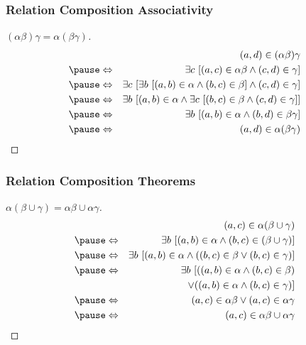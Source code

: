 \documentclass[dvipsnames]{beamer}
\begin{document}
\begin{frame}
  \frametitle{Relation Composition Associativity}

  \begin{proof}[$(\alpha \beta) \gamma = \alpha (\beta \gamma)$]
    \pause
    \begin{eqnarray*}
      &                 & (a,d) \in (\alpha \beta)\gamma\\\pause
      & \Leftrightarrow & \exists c~[(a,c) \in \alpha \beta
                              \wedge (c,d) \in \gamma]\\\pause
      & \Leftrightarrow & \exists c~[\exists b~[(a,b) \in \alpha
                                         \wedge (b,c) \in \beta]
                                         \wedge (c,d) \in \gamma]\\\pause
      & \Leftrightarrow & \exists b~[(a,b) \in \alpha
                              \wedge \exists c~[(b,c) \in \beta
                              \wedge (c,d) \in \gamma]]\\\pause
      & \Leftrightarrow & \exists b~[(a,b) \in \alpha
                              \wedge (b,d) \in \beta \gamma]\\\pause
      & \Leftrightarrow & (a,d) \in \alpha (\beta \gamma)
    \end{eqnarray*}
  \end{proof}
\end{frame}

\begin{frame}
  \frametitle{Relation Composition Theorems}

  \begin{proof}[$\alpha (\beta \cup \gamma) = \alpha \beta \cup \alpha \gamma$]
    \pause
    \begin{eqnarray*}
      &                 & (a,c) \in \alpha (\beta \cup \gamma)\\\pause
      & \Leftrightarrow & \exists b~[(a,b) \in \alpha
                              \wedge (b,c) \in (\beta \cup \gamma)]\\\pause
      & \Leftrightarrow & \exists b~[(a,b) \in \alpha
                             \wedge ((b,c) \in \beta
                                \vee (b,c) \in \gamma)]\\\pause
      & \Leftrightarrow & \exists b~[((a,b) \in \alpha \wedge (b,c) \in \beta)\\
      &                 &     ~~\vee ((a,b) \in \alpha \wedge (b,c) \in \gamma)]\\\pause
      & \Leftrightarrow & (a,c) \in \alpha \beta \vee (a,c) \in \alpha \gamma\\\pause
      & \Leftrightarrow & (a,c) \in \alpha \beta \cup \alpha \gamma
    \end{eqnarray*}
  \end{proof}
\end{frame}
\end{document}
